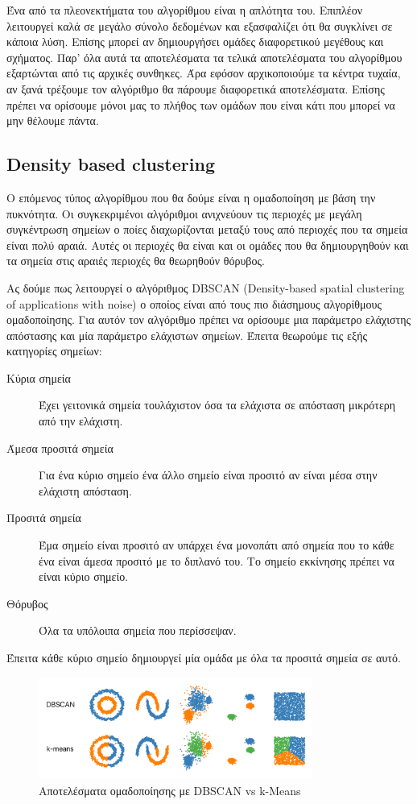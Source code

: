 Ένα από τα πλεονεκτήματα του αλγορίθμου είναι η απλότητα του. Επιπλέον λειτουργεί καλά σε μεγάλο σύνολο δεδομένων και εξασφαλίζει ότι θα συγκλίνει σε κάποια λύση. Επίσης μπορεί αν δημιουργήσει
ομάδες διαφορετικού μεγέθους και σχήματος. Παρ' όλα αυτά τα αποτελέσματα τα τελικά αποτελέσματα του αλγορίθμου εξαρτώνται από τις αρχικές συνθηκες. Άρα εφόσον αρχικοποιούμε τα κέντρα τυχαία, αν
ξανά τρέξουμε τον αλγόριθμο θα πάρουμε διαφορετικά αποτελέσματα. Επίσης πρέπει να ορίσουμε μόνοι μας το πλήθος των ομάδων που είναι κάτι που μπορεί να μην θέλουμε πάντα\cite{kmeans1}.
\subsection{\textlatin{Density based clustering}}
Ο επόμενος τύπος αλγορίθμου που θα δούμε είναι η ομαδοποίηση με βάση την πυκνότητα. Οι συγκεκριμένοι αλγόριθμοι ανιχνεύουν τις περιοχές με μεγάλη συγκέντρωση σημείων ο ποίες διαχωρίζονται μεταξύ
τους από περιοχές που τα σημεία είναι πολύ αραιά. Αυτές οι περιοχές θα είναι και οι ομάδες που θα δημιουργηθούν και τα σημεία στις αραιές περιοχές θα θεωρηθούν θόρυβος\cite{dbclust1}.\par Ας δούμε
πως λειτουργεί ο αλγόριθμος \textlatin{DBSCAN (Density-based spatial clustering of applications with noise)} ο οποίος είναι από τους πιο διάσημους αλγορίθμους ομαδοποίησης. Για αυτόν τον αλγόριθμο
πρέπει να ορίσουμε μια παράμετρο ελάχιστης απόστασης και μία παράμετρο ελάχιστων σημείων. Έπειτα θεωρούμε τις εξής κατηγορίες σημείων:
\begin{description}
    \item[Κύρια σημεία] Έχει γειτονικά σημεία τουλάχιστον όσα τα ελάχιστα σε απόσταση μικρότερη από την ελάχιστη.
    \item[Άμεσα προσιτά σημεία] Για ένα κύριο σημείο ένα άλλο σημείο είναι προσιτό αν είναι μέσα στην ελάχιστη απόσταση.
    \item[Προσιτά σημεία] Έμα σημείο είναι προσιτό αν υπάρχει ένα μονοπάτι από σημεία που το κάθε ένα είναι άμεσα προσιτό με το διπλανό του. Το σημείο εκκίνησης πρέπει να είναι κύριο σημείο.
    \item[Θόρυβος] Όλα τα υπόλοιπα σημεία που περίσσεψαν.
\end{description}
Έπειτα κάθε κύριο σημείο δημιουργεί μία ομάδα με όλα τα προσιτά σημεία σε αυτό\cite{dbscan}.
\begin{figure}[H]
    \centering
    \includegraphics[width=0.8\textwidth]{images/dbscan.png}
    \caption{Αποτελέσματα ομαδοποίησης με \textlatin{DBSCAN vs k-Means}}
\end{figure}
